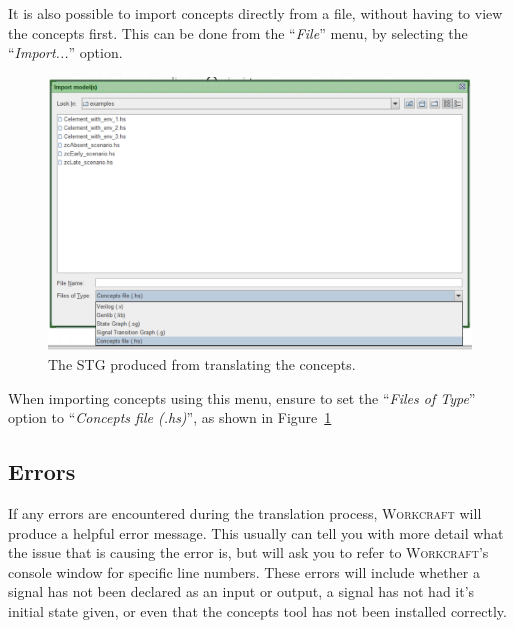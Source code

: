 \documentclass{proc}
\newcommand{\noun}[1]{\textsc{#1}}
\begin{document}
It is also possible to import concepts directly from a file, without having to view the concepts first. This can be done from the ``\emph{File}'' menu, by selecting the ``\emph{Import...}'' 
option. 

\begin{figure}[H]
\begin{centering}
\includegraphics[scale=0.4]{images/import_menu_screenshot}
\par\end{centering}

\begin{centering}
\protect\caption{\label{fig:import_menu_screenshot}The STG produced from translating the concepts.}

\par\end{centering}

\end{figure}

When importing concepts using this menu, ensure to set the ``\emph{Files of Type}'' option to ``\emph{Concepts file (.hs)}'', as shown in Figure~\ref{fig:import_menu_screenshot}

\subsection{Errors}

If any errors are encountered during the translation process, \noun{Workcraft} will produce a helpful error message. This usually can tell you with more detail what the issue that is causing 
the error is, but will ask you to refer to \noun{Workcraft}'s console window for specific line numbers. These errors will include whether a signal has not been declared as an input or output,
a signal has not had it's initial state given, or even that the concepts tool has not been installed correctly. 
\end{document}
